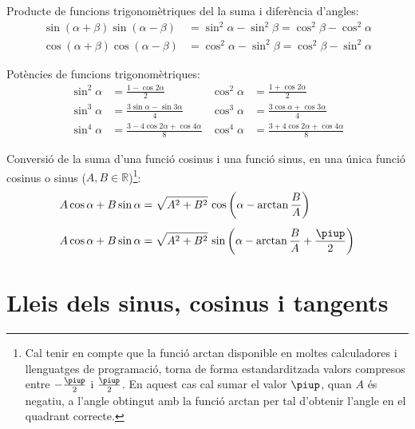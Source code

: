 Producte de funcions trigonom\`{e}triques del la suma i difer\`{e}ncia
d'angles:
\begin{subequations}
\begin{align}
    \sin(\alpha+\beta) \sin(\alpha-\beta) &= \sin^2\alpha-\sin^2\beta =
    \cos^2\beta - \cos^2\alpha\\[1ex]
    \cos(\alpha+\beta) \cos(\alpha-\beta) &= \cos^2\alpha-\sin^2\beta =
    \cos^2\beta - \sin^2\alpha
\end{align}
\end{subequations}

Pot\`{e}ncies de funcions trigonom\`{e}triques:
\begin{subequations}
\begin{align}
    \sin^2\alpha &= \frac{1-\cos 2\alpha}{2} &  \cos^2\alpha &= \frac{1+\cos 2\alpha}{2}\\[1ex]
    \sin^3\alpha &= \frac{3\sin\alpha-\sin 3\alpha}{4} &  \cos^3\alpha &= \frac{3\cos\alpha+\cos 3\alpha}{4}\\[1ex]
    \sin^4\alpha &= \frac{3-4\cos 2\alpha+\cos 4\alpha}{8} &  \cos^4\alpha &= \frac{3+4\cos 2\alpha+\cos 4\alpha}{8}
\end{align}
\end{subequations}

Conversi\'{o} de la suma d'una funci\'{o} cosinus i una funci\'{o} sinus, en una \'{u}nica
funci\'{o} cosinus o sinus ($A,B\in\mathbb{R}$)\footnote{Cal tenir en compte que la funci\'{o} \textsf{arctan} disponible en moltes calculadores i llenguatges de programaci\'{o}, torna de forma estandarditzada valors compresos entre $-\frac{\piup}{2}$ i $\frac{\piup}{2}$. En aquest cas cal sumar el valor $\piup$, quan $A$ \'{e}s negatiu, a l'angle obtingut amb la funci\'{o} \textsf{arctan} per tal d'obtenir l'angle en el quadrant correcte.}:
\begin{subequations}
\begin{align}
    A \cos \alpha + B \sin \alpha &= \sqrt{A^2+B^2}\, \cos \left(\alpha - \arctan\dfrac{B}{A}\right)\label{eq:AcosBsin}\\[1ex]
    A \cos \alpha + B \sin \alpha &= \sqrt{A^2+B^2}\, \sin \left(\alpha - \arctan\dfrac{B}{A}+\dfrac{\piup}{2}\right)\label{eq:AcosBsinS}
\end{align}
\end{subequations}


\section{Lleis dels sinus, cosinus i tangents}\label{sec:llei-s-c-t}

